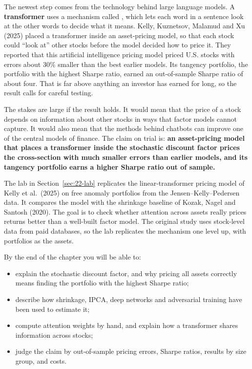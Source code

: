 The newest step comes from the technology behind large language models. A \textbf{transformer} uses a mechanism called , which lets each word in a sentence look at the other words to decide what it means. Kelly, Kuznetsov, Malamud and Xu (2025) placed a transformer inside an asset-pricing model, so that each stock could ``look at'' other stocks before the model decided how to price it. They reported that this artificial intelligence pricing model priced U.S. stocks with errors about 30\% smaller than the best earlier models. Its tangency portfolio, the portfolio with the highest Sharpe ratio, earned an out-of-sample Sharpe ratio of about four. That is far above anything an investor has earned for long, so the result calls for careful testing.

The stakes are large if the result holds. It would mean that the price of a stock depends on information about other stocks in ways that factor models cannot capture. It would also mean that the methods behind chatbots can improve one of the central models of finance. The claim on trial is: \textbf{an asset-pricing model that places a transformer inside the stochastic discount factor prices the cross-section with much smaller errors than earlier models, and its tangency portfolio earns a higher Sharpe ratio out of sample.}

The lab in Section~\ref{sec:22-lab} replicates the linear-transformer pricing model of Kelly et al.\ (2025) on free anomaly portfolios from the Jensen--Kelly--Pedersen data. It compares the model with the shrinkage baseline of Kozak, Nagel and Santosh (2020). The goal is to check whether attention across assets really prices returns better than a well-built factor model. The original study uses stock-level data from paid databases, so the lab replicates the mechanism one level up, with portfolios as the assets.

By the end of the chapter you will be able to:

\begin{itemize}
  \item explain the stochastic discount factor, and why pricing all assets correctly means finding the portfolio with the highest Sharpe ratio;
  \item describe how shrinkage, IPCA, deep networks and adversarial training have been used to estimate it;
  \item compute attention weights by hand, and explain how a transformer shares information across stocks;
  \item judge the claim by out-of-sample pricing errors, Sharpe ratios, results by size group, and costs.
\end{itemize}


